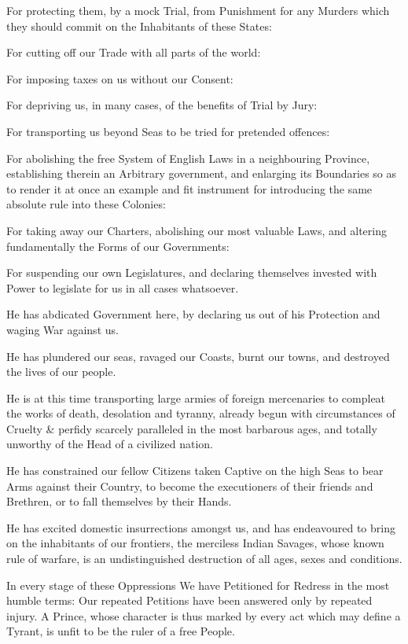 \documentclass{article}
\begin{document}
For protecting them, by a mock Trial, from Punishment for any Murders
which they should commit on the Inhabitants of these States:

For cutting off our Trade with all parts of the world:

For imposing taxes on us without our Consent:

For depriving us, in many cases, of the benefits of Trial by Jury:

For transporting us beyond Seas to be tried for pretended offences:

For abolishing the free System of English Laws in a neighbouring
Province, establishing therein an Arbitrary government,
and enlarging its Boundaries so as to render it at once
an example and fit instrument for introducing the same
absolute rule into these Colonies:

For taking away our Charters, abolishing our most valuable Laws,
and altering fundamentally the Forms of our Governments:

For suspending our own Legislatures, and declaring themselves
invested with Power to legislate for us in all cases whatsoever.

He has abdicated Government here, by declaring us out of his Protection
and waging War against us.

He has plundered our seas, ravaged our Coasts, burnt our towns,
and destroyed the lives of our people.

He is at this time transporting large armies of foreign mercenaries
to compleat the works of death, desolation and tyranny, already begun
with circumstances of Cruelty \& perfidy scarcely paralleled in the
most barbarous ages, and totally unworthy of the Head of a civilized nation.

He has constrained our fellow Citizens taken Captive on the high Seas
to bear Arms against their Country, to become the executioners of
their friends and Brethren, or to fall themselves by their Hands.

He has excited domestic insurrections amongst us, and has
endeavoured to bring on the inhabitants of our frontiers,
the merciless Indian Savages, whose known rule of warfare,
is an undistinguished destruction of all ages, sexes and conditions.

In every stage of these Oppressions We have Petitioned for Redress
in the most humble terms:  Our repeated Petitions have been answered
only by repeated injury.  A Prince, whose character is thus marked
by every act which may define a Tyrant, is unfit to be the ruler
of a free People.
\end{document}
